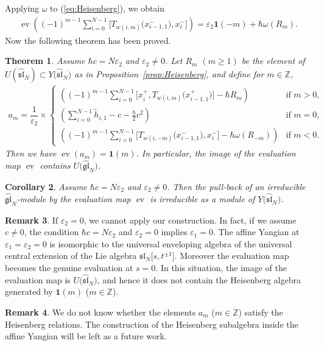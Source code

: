 \documentclass[10pt,a4paper]{amsart}
\newtheorem{thm}{Theorem}[section]
\newtheorem{cor}[thm]{Corollary}
\theoremstyle{definition}
\newtheorem{rem}[thm]{Remark}
\numberwithin{equation}{section}
\DeclareMathOperator{\ev}{ev}
\newcommand{\ve}{\varepsilon}
\newcommand{\bbZ}{\mathbb{Z}}
\newcommand{\affY}{Y\big(\affsl\big)}
\newcommand{\gl}{\mathfrak{gl}}
\newcommand{\affsl}{\hat{\mathfrak{sl}}_N}
\newcommand{\bfid}{\mathbf{1}}
\begin{document}
Applying $\omega$ to (\ref{eq:Heisenberg}), we obtain
\begin{gather*}
\ev\left( (-1)^{m-1} \sum_{i=0}^{N-1} \big[T_{w(i,m)}\big(x_{i-1,1}^-\big), x_{i}^-\big] \right) = \ve_2 \bfid(-m) + \hbar \omega(R_m).
\end{gather*}
Now the following theorem has been proved.

\begin{thm}\label{thm:image}Assume $\hbar c =N\ve_2$ and $\ve_2 \neq 0$. Let $R_m$ $(m \geq 1)$ be the element of $U(\hat{\mathfrak{sl}}_N) \subset \affY$ as in Proposition~{\rm \ref{prop:Heisenberg}}, and define for $m \in \bbZ$,
\begin{gather*}
a_{m} = \dfrac{1}{\ve_2} \times \begin{cases}
\displaystyle \left( (-1)^{m-1} \sum_{i=0}^{N-1} \big[x_{i}^+, T_{w(i,m)}\big(x_{i-1,1}^+\big)\big] - \hbar R_m\right) & \text{if $m>0$},\\
\displaystyle \left( \sum_{i=0}^{N-1} \tilde{h}_{i,1} - c - \tfrac{\hbar}{2} c^2\right) & \text{if $m=0$},\\
\displaystyle \left((-1)^{m-1} \sum_{i=0}^{N-1} \big[T_{w(i,-m)}\big(x_{i-1,1}^-\big),x_{i}^-\big] - \hbar \omega(R_{-m})\right) & \text{if $m<0$}.
\end{cases}
\end{gather*}
Then we have $\ev(a_m) = \bfid(m)$. In particular, the image of the evaluation map $\ev$ contains $U\big(\hat{\gl}_N\big)$.
\end{thm}


\begin{cor}Assume $\hbar c =N\ve_2$ and $\ve_2 \neq 0$. Then the pull-back of an irreducible $\hat{\gl}_N$-module by the evaluation map $\ev$ is irreducible as a module of $\affY$.
\end{cor}

\begin{rem}If $\ve_2 = 0$, we cannot apply our construction. In fact, if we assume $c \neq 0$, the condition $\hbar c = N\ve_2$ and $\ve_2 = 0$ implies $\ve_1=0$. The affine Yangian at $\ve_1 = \ve_2 = 0$ is isomorphic to the universal enveloping algebra of the universal central extension of the Lie algebra $\mathfrak{sl}_N\big[s,t^{\pm 1}\big]$. Moreover the evaluation map becomes the genuine evaluation at $s=0$. In this situation, the image of the evaluation map is $U\big(\affsl\big)$, and hence it does not contain the Heisenberg algebra generated by $\bfid(m)$ ($m\in \bbZ$).
\end{rem}
\begin{rem}We do not know whether the elements $a_m$ ($m \in \bbZ$) satisfy the Heisenberg relations. The construction of the Heisenberg subalgebra inside the affine Yangian will be left as a future work.
\end{rem}
\end{document}
